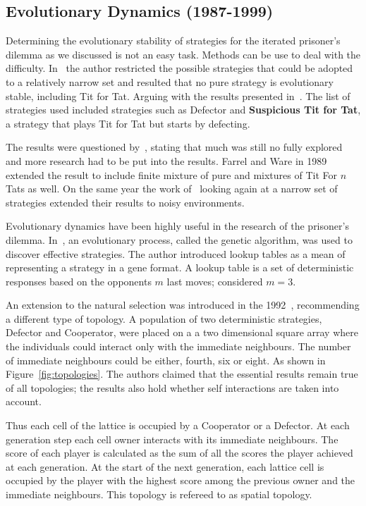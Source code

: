 \documentclass{article}
\theoremstyle{definition}
\begin{document}
\subsection{Evolutionary Dynamics (1987-1999)}
Determining the evolutionary stability of strategies for the iterated prisoner's
dilemma as we discussed is not an easy task. Methods can be use to deal with
the difficulty. In~\cite{Boyd1987} the author restricted the possible strategies
that could be adopted to a relatively narrow set and resulted that no pure strategy
is evolutionary stable, including Tit for Tat. Arguing with the results presented
in~\cite{axelrod1981}. The list of strategies used included strategies such as
Defector and \textbf{Suspicious Tit for Tat}, a strategy that plays
Tit for Tat but starts by defecting.

The results were questioned by~\cite{May1987}, stating that much was still no fully
explored and more research had to be put into the results. Farrel and Ware in
1989~\cite{Farrell1989} extended the result to include finite mixture of pure
and mixtures of Tit For \(n\) Tats as well. On the same year the work of~\cite{Boyd1989}
looking again at a narrow set of strategies extended their results to
noisy environments.

Evolutionary dynamics have been highly useful in the research of the prisoner's
dilemma. In~\cite{Axelrod1987}, an evolutionary process, called the genetic
algorithm, was used to discover effective strategies. The author introduced
lookup tables as a mean of representing a strategy in a gene format. A lookup
table is a set of deterministic responses based on the opponents \(m\) last
moves; \cite{Axelrod1987} considered \(m=3\).

An extension to the natural selection was introduced in the 1992~\cite{Nowak1992b},
recommending a different type of topology. A population of two deterministic
strategies, Defector and Cooperator, were placed on a a two dimensional square array
where the individuals could interact only with the immediate neighbours.
The number of immediate neighbours could be either, fourth, six or eight. As
shown in Figure~\ref{fig:topologies}. The authors claimed that the essential
results remain true of all topologies; the results also hold whether self interactions
are taken into account.

Thus each cell of the lattice is occupied by a Cooperator or a Defector. At
each generation step each cell owner interacts with its immediate neighbours.
The score of each player is calculated as the sum of all the scores the player
achieved at each generation. At the start of the next generation, each lattice
cell is occupied by the player with the highest score among the previous owner
and the immediate neighbours. This topology is refereed to as spatial topology.
\end{document}
